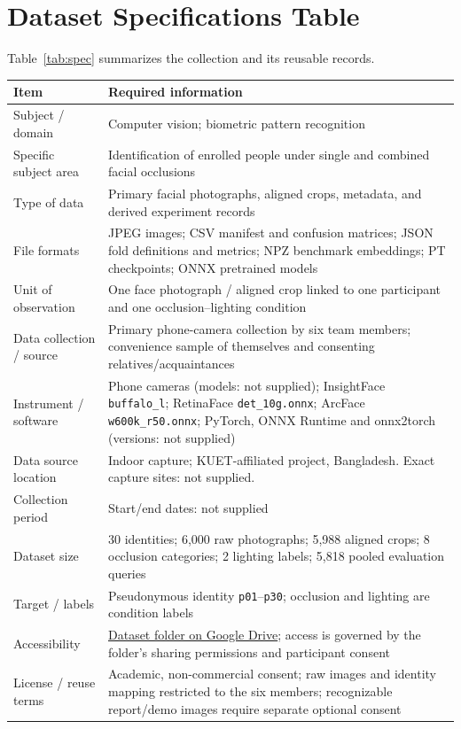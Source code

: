 \documentclass[11pt,a4paper]{article}
\newcommand{\code}[1]{\texttt{#1}}
\newcommand{\datasetlink}{\href{https://drive.google.com/drive/u/1/folders/1XN55OGpozy5Rhbs5QRFMatlCMTAo8sPu}{Dataset folder on Google Drive}}
\newenvironment{datatable}[2]{\begin{center}\begin{minipage}{\linewidth}\setstretch{1}\small\captionof{table}{#1}\label{#2}\vspace{2pt}\renewcommand{\arraystretch}{1.18}}{\end{minipage}\end{center}}
\begin{document}
\section{Dataset Specifications Table}
Table~\ref{tab:spec} summarizes the collection and its reusable records.
\begin{datatable}{Dataset specifications.}{tab:spec}
\begin{tabularx}{\linewidth}{L{40mm}Y}\toprule
Item & Required information\\\midrule
Subject / domain & Computer vision; biometric pattern recognition\\
Specific subject area & Identification of enrolled people under single and combined facial occlusions\\
Type of data & Primary facial photographs, aligned crops, metadata, and derived experiment records\\
File formats & JPEG images; CSV manifest and confusion matrices; JSON fold definitions and metrics; NPZ benchmark embeddings; PT checkpoints; ONNX pretrained models\\
Unit of observation & One face photograph / aligned crop linked to one participant and one occlusion--lighting condition\\
Data collection / source & Primary phone-camera collection by six team members; convenience sample of themselves and consenting relatives/acquaintances\\
Instrument / software & Phone cameras (models: not supplied); InsightFace \code{buffalo\_l}; RetinaFace \code{det\_10g.onnx}; ArcFace \code{w600k\_r50.onnx}; PyTorch, ONNX Runtime and onnx2torch (versions: not supplied)\\
Data source location & Indoor capture; KUET-affiliated project, Bangladesh. Exact capture sites: not supplied.\\
Collection period & Start/end dates: not supplied\\
Dataset size & 30 identities; 6,000 raw photographs; 5,988 aligned crops; 8 occlusion categories; 2 lighting labels; 5,818 pooled evaluation queries\\
Target / labels & Pseudonymous identity \code{p01}--\code{p30}; occlusion and lighting are condition labels\\
Accessibility & \datasetlink; access is governed by the folder's sharing permissions and participant consent\\
License / reuse terms & Academic, non-commercial consent; raw images and identity mapping restricted to the six members; recognizable report/demo images require separate optional consent\\\bottomrule
\end{tabularx}
\end{datatable}
\end{document}
